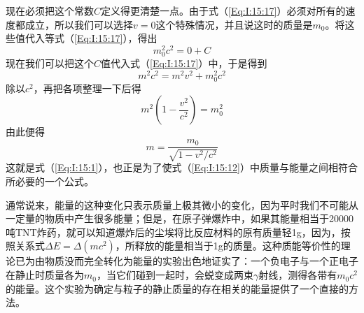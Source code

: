 现在必须把这个常数$C$定义得更清楚一点。由于式（\ref{Eq:I:15:17}）必须对所有的速度都成立，所以我们可以选择$v=0$这个特殊情况，并且说这时的质量是$m_0$。将这些值代入等式（\ref{Eq:I:15:17}），得出
\begin{equation*}
    m_0^2c^2=0+C
\end{equation*}
现在我们可以把这个$C$值代入式（\ref{Eq:I:15:17}）中，于是得到
\begin{equation}
    \label{Eq:I:15:18}
    m^2c^2=m^2v^2+m_0^2c^2
\end{equation}
除以$c^2$，再把各项整理一下后得
\begin{equation*}
    m^2(1-\frac{v^2}{c^2})=m_0^2
\end{equation*}
由此便得
\begin{equation*}
    m=\frac{m_0}{\sqrt{1-v^2/c^2}}
\end{equation*}
这就是式（\ref{Eq:I:15:1}），也正是为了使式（\ref{Eq:I:15:12}）中质量与能量之间相符合所必要的一个公式。

通常说来，能量的这种变化只表示质量上极其微小的变化，因为平时我们不可能从一定量的物质中产生很多能量；但是，在原子弹爆炸中，如果其能量相当于20000吨TNT炸药，就可以知道爆炸后的尘埃将比反应材料的原有质量轻1g，因为，按照关系式$\Delta E=\Delta (mc^2)$，所释放的能量相当于1g的质量。这种质能等价性的理论已为由物质没而完全转化为能量的实验出色地证实了：一个负电子与一个正电子在静止时质量各为$m_0$，当它们碰到一起时，会蜕变成两束$\gamma$射线，测得各带有$m_0c^2$的能量。这个实验为确定与粒子的静止质量的存在相关的能量提供了一个直接的方法。
